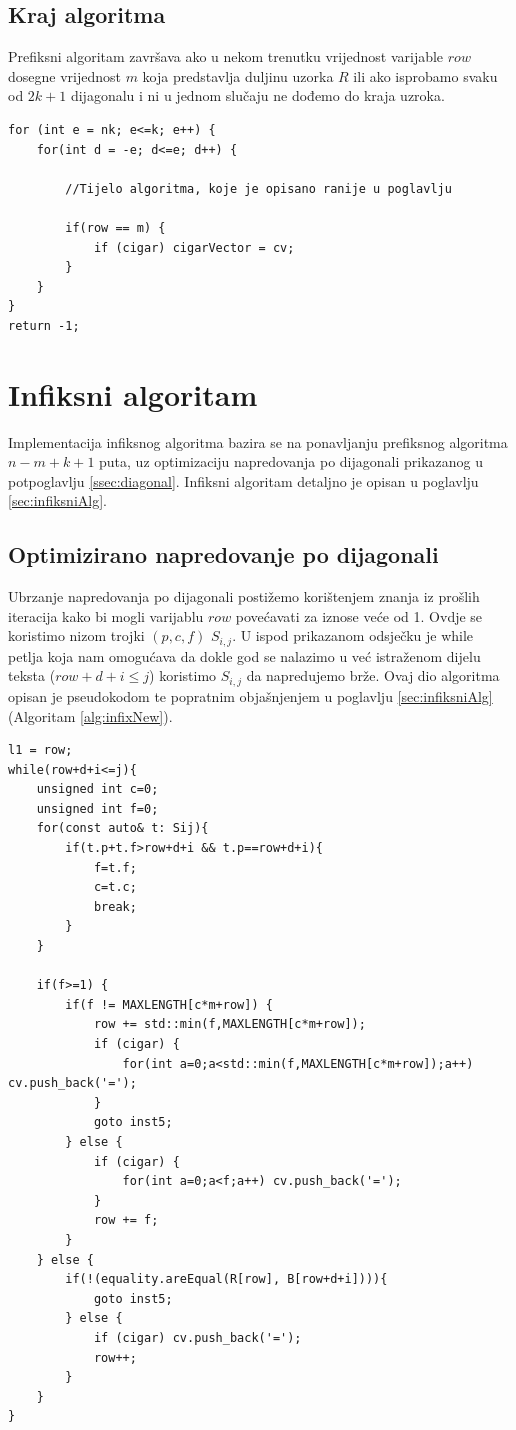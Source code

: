 \documentclass[times, utf8, zavrsni]{fer}
\begin{document}
\subsection{Kraj algoritma}
Prefiksni algoritam završava ako u nekom trenutku vrijednost varijable $row$ dosegne vrijednost $m$ koja predstavlja duljinu uzorka $R$ ili ako isprobamo svaku od $2k+1$ dijagonalu i ni u jednom slučaju ne dođemo do kraja uzroka.
\newline
\begin{lstlisting}
for (int e = nk; e<=k; e++) {
    for(int d = -e; d<=e; d++) {

        //Tijelo algoritma, koje je opisano ranije u poglavlju

        if(row == m) {
            if (cigar) cigarVector = cv;
        }
    }
}
return -1;
\end{lstlisting}

\section{Infiksni algoritam}
Implementacija infiksnog algoritma bazira se na ponavljanju prefiksnog algoritma $n-m+k+1$ puta, uz optimizaciju napredovanja po dijagonali prikazanog u potpoglavlju \ref{ssec:diagonal}. Infiksni algoritam detaljno je opisan u poglavlju \ref{sec:infiksniAlg}.
 
\subsection{Optimizirano napredovanje po dijagonali}
Ubrzanje napredovanja po dijagonali postižemo korištenjem znanja iz prošlih iteracija kako bi mogli varijablu $row$ povećavati za iznose veće od 1. Ovdje se koristimo nizom trojki $(p,c,f)$ $S_{i,j}$. U ispod prikazanom odsječku je while petlja koja nam omogućava da dokle god se nalazimo u već istraženom dijelu teksta ($row+d+i\leq j$) koristimo $S_{i,j}$ da napredujemo brže. Ovaj dio algoritma opisan je pseudokodom te popratnim objašnjenjem u poglavlju \ref{sec:infiksniAlg} (Algoritam \ref{alg:infixNew}). 
\newline
\begin{lstlisting}
l1 = row;
while(row+d+i<=j){
    unsigned int c=0;
    unsigned int f=0;
    for(const auto& t: Sij){
        if(t.p+t.f>row+d+i && t.p==row+d+i){
            f=t.f;
            c=t.c;
            break;
        }
    }

    if(f>=1) {
        if(f != MAXLENGTH[c*m+row]) {
            row += std::min(f,MAXLENGTH[c*m+row]);
            if (cigar) {
                for(int a=0;a<std::min(f,MAXLENGTH[c*m+row]);a++) cv.push_back('=');
            }
            goto inst5;
        } else {
            if (cigar) {
                for(int a=0;a<f;a++) cv.push_back('=');
            }
            row += f;
        }
    } else {
        if(!(equality.areEqual(R[row], B[row+d+i]))){
            goto inst5;
        } else {
            if (cigar) cv.push_back('=');
            row++;
        }
    }
}
\end{lstlisting}
\end{document}
